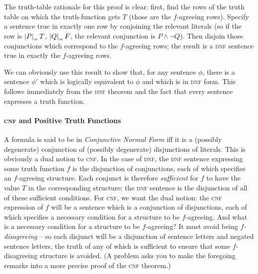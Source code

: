 The truth-table rationale for this proof is clear: first, find the rows of the truth table on which the truth-function gets $T$ (those are the $f$-agreeing rows). Specify a sentence true in exactly one row by conjoining the relevant literals (so if the row is $\left|P\right|_{\mathscr{=}}T$, $\left|Q\right|_{\mathscr{=}}F$, the relevant conjunction is $P \wedge \neg Q$). Then disjoin those conjunctions which correspond to the $f$-agreeing rows; the result is a \textsc{\lowercase{DNF}} sentence true in exactly the $f$-agreeing rows. 

We can obviously use this result to show that, for any sentence $\phi$, there is a sentence $\phi'$ which is logically equivalent to $\phi$ and which is in \textsc{\lowercase{DNF}} form. This follows immediately from the \textsc{\lowercase{DNF}} theorem and the fact that every sentence expresses a truth function.


\paragraph{\textsc{\lowercase{CNF}} and Positive Truth Functions}

A formula is said to be in \emph{Conjunctive Normal Form} iff it is a (possibly degenerate) conjunction of (possibly degenerate) disjunctions of literals. This is obviously a dual notion to \textsc{\lowercase{CNF}}.
In the case of \textsc{\lowercase{DNF}}, the \textsc{\lowercase{DNF}} sentence expressing some truth function $f$ is the disjunction of conjunctions, each of which specifies an $f$-agreeing structure. Each conjunct is therefore \emph{sufficient} for $f$ to have the value $T$ in the corresponding structure; the \textsc{\lowercase{DNF}} sentence is the disjunction of all of these sufficient conditions. For \textsc{\lowercase{CNF}}, we want the dual notion: the \textsc{\lowercase{CNF}} expression of $f$ will be a sentence which is a conjunction of disjunctions, each of which specifies a  necessary condition for a structure to be $f$-agreeing. And what is a necessary condition for a structure to be $f$-agreeing? It must avoid being \emph{$f$-disagreeing} – so each disjunct will be a disjunction of sentence letters and negated sentence letters, the truth of any of which is sufficient to ensure that some $f$-disagreeing structure is avoided.  (A problem asks you to make the foregoing remarks into a more precise proof of the \textsc{\lowercase{CNF}} theorem.)


